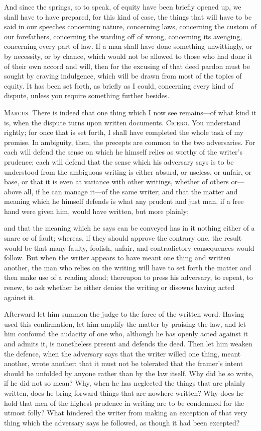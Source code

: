  And since the springs, so to speak, of equity have been briefly opened up, we shall have to have prepared, for this kind of case, the things that will have to be said in our speeches concerning nature, concerning laws, concerning the custom of our forefathers, concerning the warding off of wrong, concerning its avenging, concerning every part of law. If a man shall have done something unwittingly, or by necessity, or by chance, which would not be allowed to those who had done it of their own accord and will, then for the excusing of that deed pardon must be sought by craving indulgence, which will be drawn from most of the topics of equity. It has been set forth, as briefly as I could, concerning every kind of dispute, unless you require something further besides.

 \textsc{Marcus.} There is indeed that one thing which I now see remains—of what kind it is, when the dispute turns upon written documents. \textsc{Cicero.} You understand rightly; for once that is set forth, I shall have completed the whole task of my promise. In ambiguity, then, the precepts are common to the two adversaries. For each will defend the sense on which he himself relies as worthy of the writer's prudence; each will defend that the sense which his adversary says is to be understood from the ambiguous writing is either absurd, or useless, or unfair, or base, or that it is even at variance with other writings, whether of others or—above all, if he can manage it—of the same writer; and that the matter and meaning which he himself defends is what any prudent and just man, if a free hand were given him, would have written, but more plainly;

 and that the meaning which he says can be conveyed has in it nothing either of a snare or of fault; whereas, if they should approve the contrary one, the result would be that many faulty, foolish, unfair, and contradictory consequences would follow. But when the writer appears to have meant one thing and written another, the man who relies on the writing will have to set forth the matter and then make use of a reading aloud; thereupon to press his adversary, to repeat, to renew, to ask whether he either denies the writing or disowns having acted against it.

 Afterward let him summon the judge to the force of the written word. Having used this confirmation, let him amplify the matter by praising the law, and let him confound the audacity of one who, although he has openly acted against it and admits it, is nonetheless present and defends the deed. Then let him weaken the defence, when the adversary says that the writer willed one thing, meant another, wrote another: that it must not be tolerated that the framer's intent should be unfolded by anyone rather than by the law itself. Why did he so write, if he did not so mean? Why, when he has neglected the things that are plainly written, does he bring forward things that are nowhere written? Why does he hold that men of the highest prudence in writing are to be condemned for the utmost folly? What hindered the writer from making an exception of that very thing which the adversary says he followed, as though it had been excepted?

